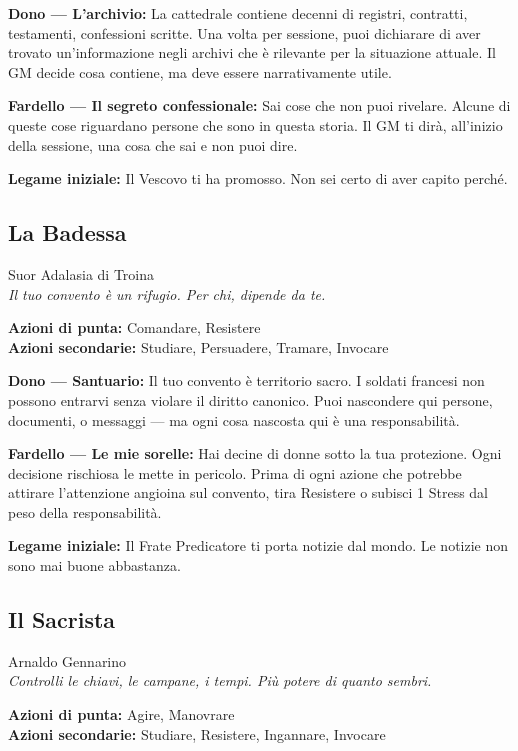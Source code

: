 \textbf{Dono — L'archivio:} La cattedrale contiene decenni di
registri, contratti, testamenti, confessioni scritte. Una volta
per sessione, puoi dichiarare di aver trovato un'informazione
negli archivi che è rilevante per la situazione attuale. Il GM
decide cosa contiene, ma deve essere narrativamente utile.

\textbf{Fardello — Il segreto confessionale:} Sai cose che non
puoi rivelare. Alcune di queste cose riguardano persone che sono
in questa storia. Il GM ti dirà, all'inizio della sessione, una
cosa che sai e non puoi dire.

\textbf{Legame iniziale:} Il Vescovo ti ha promosso. Non sei
certo di aver capito perché.

\filetto

\subsection{La Badessa}
{\cinzel\footnotesize\color{grigionote} Suor Adalasia di Troina}\\
\textit{Il tuo convento è un rifugio. Per chi, dipende da te.}

\textbf{Azioni di punta:} Comandare, Resistere\\
\textbf{Azioni secondarie:} Studiare, Persuadere, Tramare, Invocare

\textbf{Dono — Santuario:} Il tuo convento è territorio sacro.
I soldati francesi non possono entrarvi senza violare il diritto
canonico. Puoi nascondere qui persone, documenti, o messaggi —
ma ogni cosa nascosta qui è una responsabilità.

\textbf{Fardello — Le mie sorelle:} Hai decine di donne sotto
la tua protezione. Ogni decisione rischiosa le mette in pericolo.
Prima di ogni azione che potrebbe attirare l'attenzione angioina
sul convento, tira Resistere o subisci 1 Stress dal peso
della responsabilità.

\textbf{Legame iniziale:} Il Frate Predicatore ti porta notizie
dal mondo. Le notizie non sono mai buone abbastanza.

\filetto

\subsection{Il Sacrista}
{\cinzel\footnotesize\color{grigionote} Arnaldo Gennarino}\\
\textit{Controlli le chiavi, le campane, i tempi. Più potere
di quanto sembri.}

\textbf{Azioni di punta:} Agire, Manovrare\\
\textbf{Azioni secondarie:} Studiare, Resistere, Ingannare, Invocare

